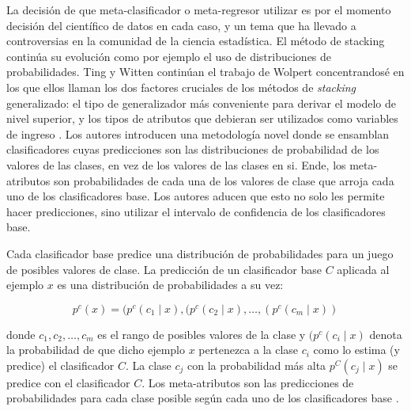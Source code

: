 La decisión de que meta-clasificador o meta-regresor utilizar es por el momento decisión del científico de datos en cada caso, y un tema que ha llevado a controversias en la comunidad de la ciencia estadística.  El método de stacking continúa su evolución como por ejemplo el uso de distribuciones de probabilidades. Ting y Witten continúan el trabajo de Wolpert concentrandosé en los que ellos llaman los dos factores cruciales de los métodos de \emph{stacking} generalizado: el tipo de generalizador más conveniente para derivar el modelo de nivel superior, y los tipos de atributos que debieran ser utilizados como variables de ingreso \cite{tingwitten}. Los autores introducen una metodología novel donde se ensamblan clasificadores cuyas predicciones son las distribuciones de probabilidad de los valores de las clases, en vez de los valores de las clases en si. Ende, los meta-atributos son probabilidades de cada una de los valores de clase que arroja cada uno de los clasificadores base. Los autores aducen que esto no solo les permite hacer predicciones, sino utilizar el intervalo de confidencia de los clasificadores base. 

Cada clasificador base predice una distribución de probabilidades para un juego de posibles valores de clase. La predicción de un clasificador base $C$ aplicada al ejemplo $x$ es una distribución de probabilidades a su vez:

\[ p^c(x) = (p^c(c_1 \mid x), (p^c(c_2 \mid x), \ldots, (p^c(c_m \mid x)) \]

donde ${c_{1}, c_{2}, \ldots, c_m}$ es el rango de posibles valores de la clase y $(p^c(c_i \mid x)$ denota la probabilidad de que dicho ejemplo $x$ pertenezca a la clase $c_i$ como lo estima (y predice) el clasificador $C$. La clase $c_j$ con la probabilidad más alta $p^C(c_j \mid x)$ se predice con el clasificador $C$. Los meta-atributos son las predicciones de probabilidades para cada clase posible según cada uno de los clasificadores base \cite{DzeroskiZenko}. 
